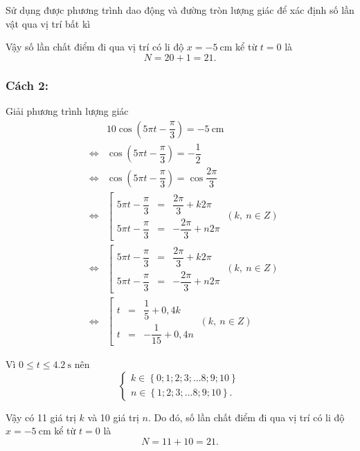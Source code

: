 \begin{dang}{Sử dụng được phương trình dao động và đường tròn lượng giác để xác định số lần vật qua vị trí bất kì}
{		Vậy số lần chất điểm đi qua vị trí có li độ $x=\SI{-5}{\centi\meter}$ kể từ $t=0$ là
		\begin{equation*}
			N=20+1=21.
		\end{equation*}
		\subsubsection{Cách 2:}
		
		Giải phương trình lượng giác
		\begin{eqnarray*}
			&&10\cos\left(5\pi t-\dfrac{\pi}{3}\right)=\SI{-5}{\centi\meter}\\
			&\Leftrightarrow& \cos\left(5\pi t-\dfrac{\pi}{3}\right)=-\dfrac{1}{2}\\
			&\Leftrightarrow& \cos\left(5\pi t-\dfrac{\pi}{3}\right)=\cos \dfrac{2\pi}{3}\\
			&\Leftrightarrow& \left[
			\begin{matrix}
				5\pi t-\dfrac{\pi}{3}&=&\dfrac{2\pi}{3}+k2\pi\\
				5\pi t-\dfrac{\pi}{3}&=&-\dfrac{2\pi}{3}+n2\pi
			\end{matrix}
			\right.\ (k,\ n \in Z)\\
			&\Leftrightarrow& \left[
			\begin{matrix}
				5\pi t-\dfrac{\pi}{3}&=&\dfrac{2\pi}{3}+k2\pi\\
				5\pi t-\dfrac{\pi}{3}&=&-\dfrac{2\pi}{3}+n2\pi
			\end{matrix}
			\right.\ (k,\ n \in Z)\\
			&\Leftrightarrow& \left[
			\begin{matrix}
				t&=&\dfrac{1}{5}+0,4k\\
				t&=&-\dfrac{1}{15}+0,4n
			\end{matrix}
			\right.\ (k,\ n \in Z)
		\end{eqnarray*}
		
		Vì $0\leq t \leq \SI{4,2}{\second}$ nên
		\begin{equation*}
			\left\{
			\begin{matrix}
				k\in\left\lbrace 0;1;2;3;...8;9;10\right\rbrace\\
				n\in\left\lbrace 1;2;3;...8;9;10 \right\rbrace.
			\end{matrix}
			\right.
		\end{equation*}
		
		Vậy có 11 giá trị $k$ và 10 giá trị $n$. Do đó, số lần chất điểm đi qua vị trí có li độ $x=\SI{-5}{\centi\meter}$ kể từ $t=0$ là
		\begin{equation*}
			N=11+10=21.
		\end{equation*}
		
}
\end{dang}
